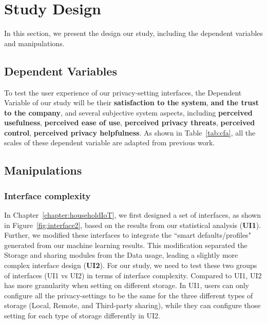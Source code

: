 \section{Study Design}
In this section, we present the design our study, including the dependent variables and manipulations.
\subsection{Dependent Variables}
To test the user experience of our privacy-setting interfaces, the Dependent Variable of our study will be their \textbf{satisfaction to the system}, \textbf{and the trust to the company}, and several subjective system aspects, including \textbf{perceived usefulness}, \textbf{perceived ease of use}, \textbf{perceived privacy threats}, \textbf{perceived control}, \textbf{perceived privacy helpfulness}. As shown in Table~\ref{tab:cfa}, all the scales of these dependent variable are adapted from previous work.

\subsection{Manipulations}

\subsubsection{Interface complexity}
In Chapter~\ref{chapter:householdIoT},  we first designed a set of interfaces, as shown in Figure~\ref{fig:interface2}, based on the results from our statistical analysis (\textbf{UI1}). Further, we modified these interfaces to integrate the ``smart defaults/profiles" generated from our machine learning results. This modification separated the Storage and sharing modules from the Data usage, leading a slightly more complex interface design (\textbf{UI2}). For our study, we need to test these two groups of interfaces (UI1 vs UI2) in terms of interface complexity. Compared to UI1, UI2 has more granularity when setting on different storage. In UI1, users can only configure all the privacy-settings to be the same for the three different types of storage (Local, Remote, and Third-party sharing), while they can configure those setting for each type of storage differently in UI2.

